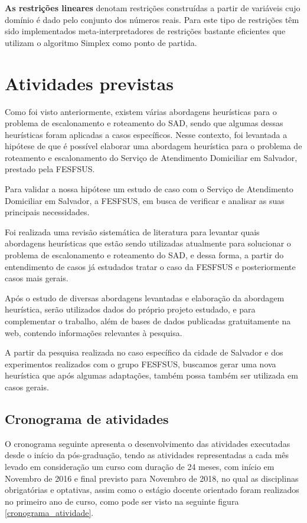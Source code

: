 \textbf{As restrições lineares} denotam restrições construídas a partir de variáveis cujo domínio é dado pelo conjunto dos números reais. Para este tipo de
restrições têm sido implementados meta-interpretadores de restrições bastante
eficientes que utilizam o algoritmo Simplex como ponto de partida.

\section{Atividades previstas}
Como foi visto anteriormente, existem várias abordagens heurísticas para o problema de escalonamento e roteamento do \ac{SAD}, sendo que algumas dessas heurísticas foram aplicadas a casos específicos. Nesse contexto, foi levantada a hipótese de que é possível elaborar uma abordagem heurística para o problema de roteamento e escalonamento do Serviço de Atendimento Domiciliar em Salvador, prestado pela \ac{FESFSUS}.

Para validar a nossa hipótese um estudo de caso com o Serviço de Atendimento Domiciliar em Salvador, a \ac{FESFSUS}, em busca de verificar e analisar as suas principais necessidades.

Foi realizada uma revisão sistemática de literatura para levantar quais abordagens heurísticas que estão sendo utilizadas atualmente para solucionar o problema de escalonamento e roteamento do \ac{SAD}, e dessa forma, a partir do entendimento de casos já estudados tratar o caso da \ac{FESFSUS} e posteriormente casos mais gerais.

Após o estudo de diversas abordagens levantadas e elaboração da abordagem heurística, serão utilizados dados do próprio projeto estudado, e para complementar o trabalho, além de bases de dados publicadas gratuitamente na web, contendo informações relevantes à pesquisa.

A partir da pesquisa realizada no caso específico da cidade de Salvador e dos experimentos realizados com o grupo \ac{FESFSUS}, buscamos gerar uma nova heurística que após algumas adaptações, também possa também ser utilizada em casos gerais.

\subsection{Cronograma de atividades}

O cronograma seguinte apresenta o desenvolvimento das atividades executadas desde o início da pós-graduação, tendo as atividades representadas a cada mês levado em consideração um curso com duração de 24 meses, com início em Novembro de 2016 e final previsto para Novembro de 2018, no qual as disciplinas obrigatórias e optativas, assim como o estágio docente orientado foram realizados no primeiro ano de curso, como pode ser visto na seguinte figura \ref{cronograma_atividade}.

